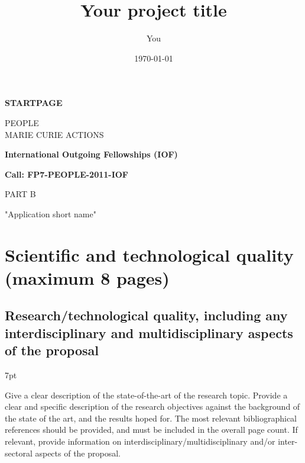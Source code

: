 \documentclass[11pt]{ltxdoc}
\author{You}
\title{Your project title}
\date{\today}
\newcommand{\CallName}{International Outgoing Fellowships (IOF)}
\newcommand{\CallID}{FP7-PEOPLE-2011-IOF}
\newcommand{\AppShortTitle}{Application short name}
\newenvironment{formal}{%
  \def\FrameCommand{%
    \hspace{1pt}%
    {\color{darkblue}\vrule width 2pt}%
    {\color{formalshade}\vrule width 4pt}%
    \colorbox{formalshade}%
  }%
  \MakeFramed{\advance\hsize-\width\FrameRestore}%
  \noindent\hspace{-4.55pt}%
  \begin{adjustwidth}{}{7pt}%
  \vspace{2pt}\vspace{2pt}%
}
{%
  \vspace{2pt}\end{adjustwidth}\endMakeFramed%
}
\begin{document}

\thispagestyle{empty}
\begin{center}

\Huge{\bf STARTPAGE}

\vspace{4cm}

\Large{PEOPLE\\MARIE CURIE ACTIONS}

\vspace{4cm}

\Large{\bf \CallName}

\Large{\bf Call: \CallID}

\vspace{4cm}

\huge{PART B}

\vspace{4cm}

\huge{"\AppShortTitle"}

\end{center}

\clearpage


\tableofcontents


\section{Scientific and technological quality (maximum 8 pages)}

\subsection{Research/technological quality, including any
  interdisciplinary and multidisciplinary aspects of the proposal}

\begin{formal}
  Give a clear description of the state-of-the-art of the research
  topic. Provide a clear and specific description of the research
  objectives against the background of the state of the art, and the
  results hoped for. The most relevant bibliographical references
  should be provided, and must be included in the overall page
  count. If relevant, provide information on
  interdisciplinary/multidisciplinary and/or inter-sectoral aspects of
  the proposal.
\end{formal}
\end{document}
